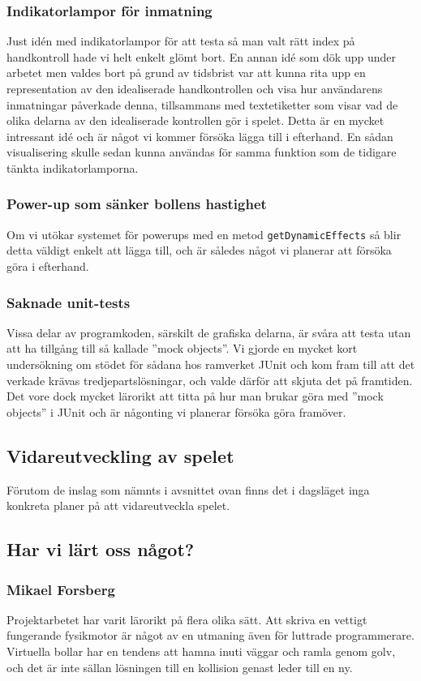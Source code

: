 \documentclass[a4paper,11pt]{article}
\begin{document}
\subsubsection{Indikatorlampor för inmatning}
Just idén med indikatorlampor för att testa så man valt rätt index på handkontroll hade vi helt
enkelt glömt bort. En annan idé som dök upp under arbetet men valdes bort på grund av tidsbrist var
att kunna rita upp en representation av den idealiserade handkontrollen och visa hur användarens
inmatningar påverkade denna, tillsammans med textetiketter som visar vad de olika delarna av
den idealiserade kontrollen gör i spelet. Detta är en mycket intressant idé och är något vi kommer
försöka lägga till i efterhand. En sådan visualisering skulle sedan kunna användas för samma
funktion som de tidigare tänkta indikatorlamporna.

\subsubsection{Power-up som sänker bollens hastighet}
Om vi utökar systemet för powerups med en metod \texttt{getDynamicEffects} så blir detta väldigt
enkelt att lägga till, och är således något vi planerar att försöka göra i efterhand.

\subsubsection{Saknade unit-tests}
Vissa delar av programkoden, särskilt de grafiska delarna, är svåra att testa utan att ha tillgång
till så kallade ''mock objects''. Vi gjorde en mycket kort undersökning om stödet för sådana hos
ramverket JUnit och kom fram till att det verkade krävas tredjepartslösningar, och valde därför
att skjuta det på framtiden. Det vore dock mycket lärorikt att titta på hur man brukar göra med
''mock objects'' i JUnit och är någonting vi planerar försöka göra framöver.

\subsection{Vidareutveckling av spelet}
Förutom de inslag som nämnts i avsnittet ovan finns det i dagsläget inga konkreta planer på att
vidareutveckla spelet.

\subsection{Har vi lärt oss något?}
\subsubsection{Mikael Forsberg}
Projektarbetet har varit lärorikt på flera olika sätt. Att skriva en vettigt fungerande fysikmotor
är något av en utmaning även för luttrade programmerare. Virtuella bollar har en tendens att
hamna inuti väggar och ramla genom golv, och det är inte sällan lösningen till en kollision genast
leder till en ny.
\end{document}
